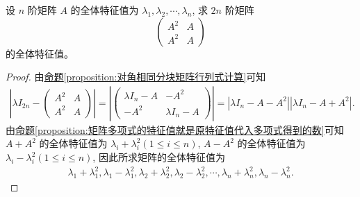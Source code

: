 \documentclass[../../main.tex]{subfiles}%
\begin{document}
\begin{example}
设 $n$ 阶矩阵 $A$ 的全体特征值为 $\lambda_1, \lambda_2, \cdots, \lambda_n$, 求 $2n$ 阶矩阵
\[
\begin{pmatrix}
A^2 & A \\
A^2 & A
\end{pmatrix}
\]
的全体特征值。
\end{example}
\begin{proof}

由\hyperref[proposition:对角相同分块矩阵行列式计算]{命题\ref{proposition:对角相同分块矩阵行列式计算}}可知
\begin{align*}
\left| \lambda I_{2n} - \begin{pmatrix}
A^2 & A \\
A^2 & A
\end{pmatrix} \right| = \left| \begin{pmatrix}
\lambda I_n - A & -A^2 \\
-A^2 & \lambda I_n - A
\end{pmatrix} \right| = |\lambda I_n - A - A^2||\lambda I_n - A + A^2|.
\end{align*}
由\hyperref[proposition:矩阵多项式的特征值就是原特征值代入多项式得到的数]{命题\ref{proposition:矩阵多项式的特征值就是原特征值代入多项式得到的数}}可知 $A + A^2$ 的全体特征值为 $\lambda_i + \lambda_i^2 (1 \leqslant  i \leqslant  n)$, $A - A^2$ 的全体特征值为 $\lambda_i - \lambda_i^2 (1 \leqslant  i \leqslant  n)$, 因此所求矩阵的全体特征值为
\begin{align*}
\lambda_1 + \lambda_1^2, \lambda_1 - \lambda_1^2, \lambda_2 + \lambda_2^2, \lambda_2 - \lambda_2^2, \cdots, \lambda_n + \lambda_n^2, \lambda_n - \lambda_n^2.
\end{align*}

\end{proof}
\end{document}
